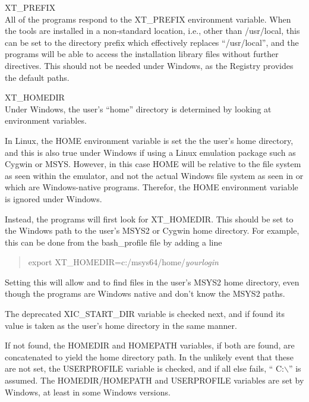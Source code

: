\begin{description}
\item{\et XT\_PREFIX}\\
All of the {\XicTools} programs respond to the {\et XT\_PREFIX}
environment variable.  When the tools are installed in a non-standard
location, i.e., other than {\vt /usr/local}, this can be set to the
directory prefix which effectively replaces ``{\vt /usr/local}'', and
the programs will be able to access the installation library files
without further directives.  This should not be needed under Windows,
as the Registry provides the default paths.

\item{\et XT\_HOMEDIR}\\
Under Windows, the user's ``home'' directory is determined by looking
at environment variables.

In Linux, the {\et HOME} environment variable is set the the user's home
directory, and this is also true under Windows if using a Linux emulation
package such as Cygwin or MSYS.  However, in this case {\et HOME} will be
relative to the file system as seen within the emulator, and not the
actual Windows file system as seen in {\Xic} or {\WRspice} which are
Windows-native programs.  Therefor, the {\et HOME} environment variable
is ignored under Windows.

Instead, the programs will first look for {\et XT\_HOMEDIR}.  This
should be set to the Windows path to the user's MSYS2 or Cygwin home  
directory.  For example, this can be done from the {\vt bash\_profile}
file by adding a line
\begin{quote}
{\vt export XT\_HOMEDIR=c:/msys64/home/}{\it yourlogin}
\end{quote}
Setting this will allow {\Xic} and {\WRspice} to find files in the
user's MSYS2 home directory, even though the programs are Windows
native and don't know the MSYS2 paths.

The deprecated {\et XIC\_START\_DIR} variable is checked next, and if
found its value is taken as the user's home directory in the same
manner.

If not found, the {\et HOMEDIR} and {\et HOMEPATH}
variables, if both are found, are concatenated to yield the home
directory path.  In the unlikely event that these are not set, the
{\et USERPROFILE} variable is checked, and if all else fails, ``{\vt
C:$\backslash$}'' is assumed.  The {\et HOMEDIR}/{\et HOMEPATH} and
{\et USERPROFILE} variables are set by Windows, at least in some
Windows versions.


\end{description}
